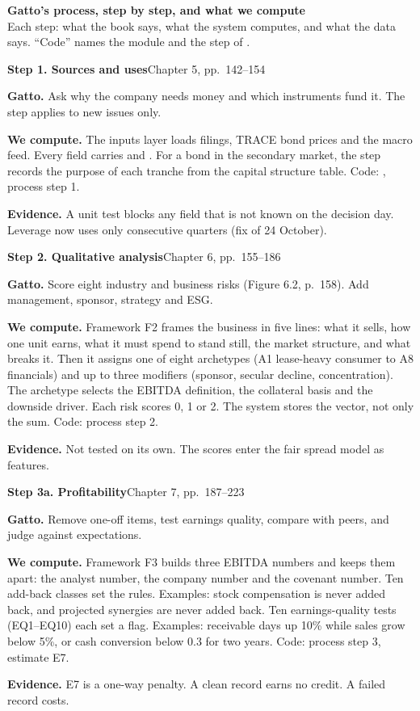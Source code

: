\newpage
\begin{center}
{\Large\bfseries Gatto's process, step by step, and what we compute}\\[2pt]
{\small Each step: what the book says, what the system computes, and what the data says. ``Code'' names the module and the step of .}
\end{center}

\newcommand{\step}[3]{\par\medskip\noindent\colorbox{spine!10}{\parbox{\dimexpr\linewidth-2\fboxsep}{\textbf{#1}\hfill{\small #2}}}\par\nopagebreak\smallskip\noindent #3}
\newcommand{\gatto}{\textbf{Gatto.} }
\newcommand{\we}{\par\noindent\textbf{We compute.} }
\newcommand{\data}{\par\noindent\textbf{Evidence.} }

\step{Step 1. Sources and uses}{Chapter 5, pp.~142--154}{%
\gatto Ask why the company needs money and which instruments fund it. The step applies to new issues only.
\we The inputs layer loads filings, TRACE bond prices and the macro feed. Every field carries \code{as\_of} and \code{available\_at}. For a bond in the secondary market, the step records the purpose of each tranche from the capital structure table. Code: \code{hy/inputs.py}, process step 1.
\data A unit test blocks any field that is not known on the decision day. Leverage now uses only consecutive quarters (fix of 24 October).}

\step{Step 2. Qualitative analysis}{Chapter 6, pp.~155--186}{%
\gatto Score eight industry and business risks (Figure 6.2, p.~158). Add management, sponsor, strategy and ESG.
\we Framework F2 frames the business in five lines: what it sells, how one unit earns, what it must spend to stand still, the market structure, and what breaks it. Then it assigns one of eight archetypes (A1 lease-heavy consumer to A8 financials) and up to three modifiers (sponsor, secular decline, concentration). The archetype selects the EBITDA definition, the collateral basis and the downside driver. Each risk scores 0, 1 or 2. The system stores the vector, not only the sum. Code: process step 2.
\data Not tested on its own. The scores enter the fair spread model as features.}

\step{Step 3a. Profitability}{Chapter 7, pp.~187--223}{%
\gatto Remove one-off items, test earnings quality, compare with peers, and judge against expectations.
\we Framework F3 builds three EBITDA numbers and keeps them apart: the analyst number, the company number and the covenant number. Ten add-back classes set the rules. Examples: stock compensation is never added back, and projected synergies are never added back. Ten earnings-quality tests (EQ1--EQ10) each set a flag. Examples: receivable days up 10\% while sales grow below 5\%, or cash conversion below 0.3 for two years. Code: process step 3, estimate E7.
\data E7 is a one-way penalty. A clean record earns no credit. A failed record costs.}

